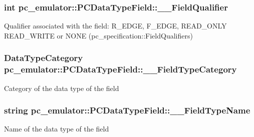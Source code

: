 \subsubsection[{\texorpdfstring{\+\_\+\+\_\+\+Field\+Qualifier}{__FieldQualifier}}]{\setlength{\rightskip}{0pt plus 5cm}int pc\+\_\+emulator\+::\+P\+C\+Data\+Type\+Field\+::\+\_\+\+\_\+\+Field\+Qualifier}\hypertarget{classpc__emulator_1_1PCDataTypeField_a5eddd90856c1071bdf0a4baf30c4fa77}{}\label{classpc__emulator_1_1PCDataTypeField_a5eddd90856c1071bdf0a4baf30c4fa77}
Qualifier associated with the field\+: R\+\_\+\+E\+D\+GE, F\+\_\+\+E\+D\+GE, R\+E\+A\+D\+\_\+\+O\+N\+LY R\+E\+A\+D\+\_\+\+W\+R\+I\+TE or N\+O\+NE (pc\+\_\+specification\+::\+Field\+Qualifiers) 
\subsubsection[{\texorpdfstring{\+\_\+\+\_\+\+Field\+Type\+Category}{__FieldTypeCategory}}]{\setlength{\rightskip}{0pt plus 5cm}Data\+Type\+Category pc\+\_\+emulator\+::\+P\+C\+Data\+Type\+Field\+::\+\_\+\+\_\+\+Field\+Type\+Category}\hypertarget{classpc__emulator_1_1PCDataTypeField_a6e8ad7acbf8e2b790f94e9080b64ef08}{}\label{classpc__emulator_1_1PCDataTypeField_a6e8ad7acbf8e2b790f94e9080b64ef08}
Category of the data type of the field 
\subsubsection[{\texorpdfstring{\+\_\+\+\_\+\+Field\+Type\+Name}{__FieldTypeName}}]{\setlength{\rightskip}{0pt plus 5cm}string pc\+\_\+emulator\+::\+P\+C\+Data\+Type\+Field\+::\+\_\+\+\_\+\+Field\+Type\+Name}\hypertarget{classpc__emulator_1_1PCDataTypeField_ab43f2a1a7aa58ff241ed65fd16da750d}{}\label{classpc__emulator_1_1PCDataTypeField_ab43f2a1a7aa58ff241ed65fd16da750d}
Name of the data type of the field 
